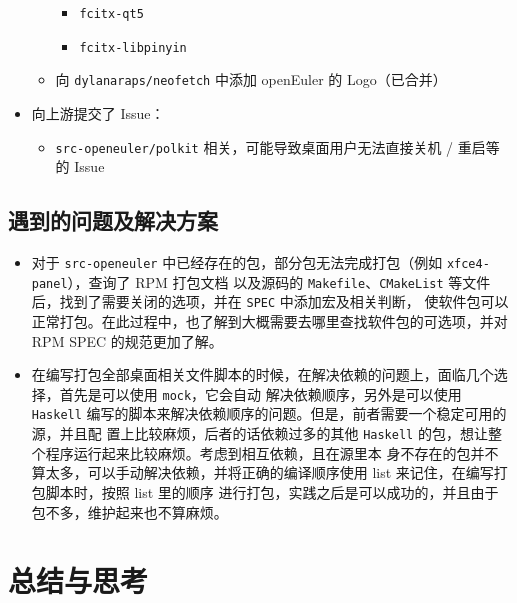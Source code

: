 \documentclass[letterpaper,12pt]{article}
\newcommand\link[1]{\href{#1}{\color{black}\faLink}}
\begin{document}
\begin{itemize}
\begin{itemize}
\begin{itemize}
                    \item \verb!fcitx-qt5! \link{https://gitee.com/raspi-oo/fcitx-qt5}
                    \item \verb!fcitx-libpinyin! \link{https://gitee.com/raspi-oo/fcitx-libpinyin}
                \end{itemize}
                \item 向 \verb!dylanaraps/neofetch! 中添加 openEuler 的 Logo（已合并） \link{https://github.com/dylanaraps/neofetch/pull/1510}
            \end{itemize}
        \item 向上游提交了 Issue：
            \begin{itemize}
                \item \verb!src-openeuler/polkit! 相关，可能导致桌面用户无法直接关机 / 重启等的 Issue \link{https://gitee.com/src-openeuler/polkit/issues/I1Q8EF?from=project-issue}
            \end{itemize}
    \end{itemize}

\subsection{遇到的问题及解决方案}
    \begin{itemize}
        \item 对于 \verb!src-openeuler! 中已经存在的包，部分包无法完成打包（例如 \verb!xfce4-panel!），查询了 RPM 打包文档
        以及源码的 \verb!Makefile!、\verb!CMakeList! 等文件后，找到了需要关闭的选项，并在 \verb!SPEC! 中添加宏及相关判断，
        使软件包可以正常打包。在此过程中，也了解到大概需要去哪里查找软件包的可选项，并对 RPM SPEC 的规范更加了解。
        \item 在编写打包全部桌面相关文件脚本的时候，在解决依赖的问题上，面临几个选择，首先是可以使用 \verb!mock!，它会自动
        解决依赖顺序，另外是可以使用 \verb!Haskell! 编写的脚本来解决依赖顺序的问题。但是，前者需要一个稳定可用的源，并且配
        置上比较麻烦，后者的话依赖过多的其他 \verb!Haskell! 的包，想让整个程序运行起来比较麻烦。考虑到相互依赖，且在源里本
        身不存在的包并不算太多，可以手动解决依赖，并将正确的编译顺序使用 list 来记住，在编写打包脚本时，按照 list 里的顺序
        进行打包，实践之后是可以成功的，并且由于包不多，维护起来也不算麻烦。
    \end{itemize}

\section{总结与思考}
\end{document}

